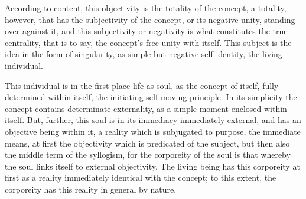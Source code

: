 According to content, this objectivity is
the totality of the concept, a totality,
however, that has the subjectivity of the concept,
or its negative unity, standing over against it,
and this subjectivity or negativity is
what constitutes the true centrality,
that is to say, the concept's free unity with itself.
This subject is the idea in the form of singularity,
as simple but negative self-identity,
the living individual.

This individual is in the first place life as soul,
as the concept of itself, fully determined within itself,
the initiating self-moving principle.
In its simplicity the concept contains determinate externality,
as a simple moment enclosed within itself.
But, further, this soul is
in its immediacy immediately external,
and has an objective being within it,
a reality which is subjugated to purpose, the immediate means,
at first the objectivity which is predicated of the subject,
but then also the middle term of the syllogism,
for the corporeity of the soul is that
whereby the soul links itself to external objectivity.
The living being has this corporeity at first as a reality
immediately identical with the concept;
to this extent, the corporeity has
this reality in general by nature.

